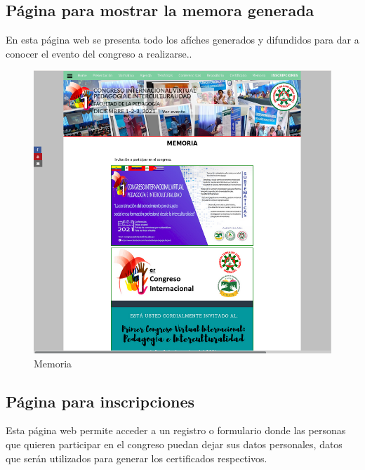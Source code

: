 \documentclass[a4paper,14px]{article}
\begin{document}
\newpage
\subsection{Página para mostrar la memora generada}
\label{sec:pagina-principal}

En esta página web se presenta todo los afíches generados y difundidos para dar a conocer el evento del congreso a realizarse..


\begin{figure}[H]
  \centering
  \includegraphics[scale=0.6]{memoria.png}
  \caption{Memoria}
  \label{fig:arquitectura}
\end{figure}

\newpage
\subsection{Página para inscripciones }
\label{sec:pagina-principal}

Esta página web permite acceder a un registro o formulario donde las personas que quieren participar en el congreso puedan dejar sus datos personales, datos que serán utilizados para generar los certificados respectivos.
\end{document}
